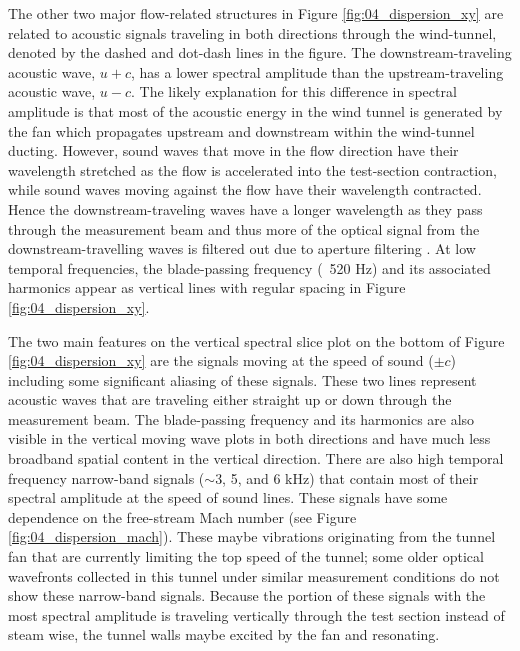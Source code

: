 The other two major flow-related structures in Figure \ref{fig:04_dispersion_xy} are related to acoustic signals traveling in both directions through the wind-tunnel, denoted by the dashed and dot-dash lines in the figure.
The downstream-traveling acoustic wave, $u+c$, has a lower spectral amplitude than the upstream-traveling acoustic wave, $u-c$.
The likely explanation for this difference in spectral amplitude is that most of the acoustic energy in the wind tunnel is generated by the fan which propagates upstream and downstream within the wind-tunnel ducting.
However, sound waves that move in the flow direction have their wavelength stretched as the flow is accelerated into the test-section contraction, while sound waves moving against the flow have their wavelength contracted.
Hence the downstream-traveling waves have a longer wavelength as they pass through the measurement beam and thus more of the optical signal from the downstream-travelling waves is filtered out due to aperture filtering \cite{Siegenthaler-2008-9Yutbt6c}.
At low temporal frequencies, the blade-passing frequency (~520 Hz) and its associated harmonics appear as vertical lines with regular spacing in Figure \ref{fig:04_dispersion_xy}.

The two main features on the vertical spectral slice plot on the bottom of Figure \ref{fig:04_dispersion_xy} are the signals moving at the speed of sound ($\pm c$) including some significant aliasing of these signals.
These two lines represent acoustic waves that are traveling either straight up or down through the measurement beam.
The blade-passing frequency and its harmonics are also visible in the vertical moving wave plots in both directions and have much less broadband spatial content in the vertical direction.
There are also high temporal frequency narrow-band signals ($\sim$3, 5, and 6 kHz) that contain most of their spectral amplitude at the speed of sound lines.
These signals have some dependence on the free-stream Mach number (see Figure \ref{fig:04_dispersion_mach}).
These maybe vibrations originating from the tunnel fan that are currently limiting the top speed of the tunnel; some older optical wavefronts collected in this tunnel under similar measurement conditions do not show these narrow-band signals.
Because the portion of these signals with the most spectral amplitude is traveling vertically through the test section instead of steam wise, the tunnel walls maybe excited by the fan and resonating.

